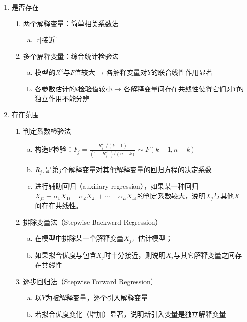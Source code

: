 \documentclass[12pt]{book}
\begin{document}
\begin{enumerate}[1.]
    \item 是否存在
          \begin{enumerate}[(1)]
            \item 两个解释变量：简单相关系数法
              \begin{enumerate}[a.]
                \item  $|r|$接近1
              \end{enumerate}
              \item 多个解释变量：综合统计检验法
              \begin{enumerate}[a.]
                \item  模型的$R^2$与$F$值较大 → 各解释变量对$Y$的联合线性作用显著
                \item  各参数估计的$t$检验值较小 → 各解释变量间存在共线性使得它们对$Y$的独立作用不能分辨
              \end{enumerate}
          \end{enumerate}
    \item 存在范围
          \begin{enumerate}[(1)]
              \item 判定系数检验法
                    \begin{enumerate}[a.]
                        \item 构造F检验：$F_j=\frac{R_{j\cdot}^{2}/(k-1)}{(1-R_{j\cdot}^{2})/(n-k)}\sim F(k-1,n-k)$
                        \item $R_{j\cdot}$是第$j$个解释变量对其他解释变量的回归方程的决定系数
                        \item 进行辅助回归（auxiliary regression），如果某一种回归$X_{ji}=\alpha_{1}X_{1i}+\alpha_{2}X_{2i}+\cdots+\alpha_{L}X_{Li}$的判定系数较大，说明$X_j$与其他$X$间存在共线性。
                    \end{enumerate}
              \item 排除变量法（Stepwise Backward Regression）
                    \begin{enumerate}[a.]
                        \item 在模型中排除某一个解释变量$X_j$，估计模型；
                        \item 如果拟合优度与包含$X_j$时十分接近，则说明$X_j$与其它解释变量之间存在共线性
                    \end{enumerate}
              \item 逐步回归法（Stepwise Forward Regression）
                    \begin{enumerate}[a.]
                        \item 以$Y$为被解释变量，逐个引入解释变量
                        \item 若拟合优度变化（增加）显著，说明新引入变量是独立解释变量
                    \end{enumerate}
          \end{enumerate}
\end{enumerate}
\end{document}
